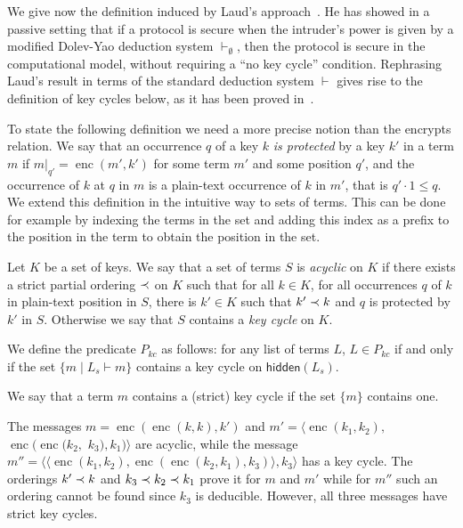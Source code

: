 \documentclass[acmtocl,acmnow]{acmtrans2m}
\newcommand{\set}[1]{\lbrace{#1}\rbrace}
\newcommand{\pair}[2]{\langle{#1},{#2}\rangle}
\newcommand{\penc}[2]{\operatorname{enc}(#1,#2)}
\newcommand{\enc}{\operatorname{enc}}
\newcommand{\lset}[1]{#1_s}
\newcommand{\hidden}[1]{\mathsf{hidden}({#1})}
\begin{document}
We give now the definition induced by Laud's approach~\cite{Laud-NORDSEC02}. He has showed in a passive
setting that if a protocol is secure when the intruder's power is given by a modified Dolev-Yao deduction
system $\vdash_{\emptyset}$, then the protocol is secure in the computational model, without requiring a ``no
key cycle'' condition. Rephrasing Laud's result in terms of the standard deduction system $\vdash$ gives rise
to the definition of key cycles below, as it has been proved in~\cite{Janvier-these}.

To state the following definition we need a more precise notion than the encrypts relation. We say that
an occurrence $q$ of a key $k$ \emph{is protected} by a key $k'$ in a term $m$
if $m|_{q'}=\penc{m'}{k'}$ for some term $m'$ and some position $q'$, and the occurrence of $k$ at $q$ in
$m$ is a plain-text
occurrence of $k$ in $m'$, that is $q'\cdot 1\le q$. We extend this definition in the intuitive way to sets of terms. This can be done for example
by indexing the terms in the set and adding this index as a prefix to the position in the term to
obtain the position in the set.




\begin{definition}\label{def:kc}Let $K$ be a set of keys. We say that a set of terms $S$ is \emph{acyclic} on $K$ if there
exists a strict partial ordering
$\prec$ on $K$ such that for all $k\in K$, for all occurrences $q$ of $k$ in plain-text position in $S$, there
is $k'\in K$ such that $k'\prec k$ and $q$ is protected by $k'$ in $S$. Otherwise we say that $S$ contains a \emph{key cycle} on $K$.

We define the predicate $P_{kc}$ as follows: for any list of terms $L$,
$L\in P_{kc}$ if and only if
the set $\set{m\mid \lset{L}\vdash m}$ contains a key cycle on $\hidden{\lset{L}}$.
\end{definition}

We say that a term $m$ contains a (strict) key cycle if the set $\{m\}$ contains one.

\begin{example}
The messages $m=\enc(\enc({k},{k}),{k'})$ and
$m'\!=\!\langle{\enc(k_1,k_2)},$ $\enc(\enc(k_2,$ $k_3),k_1)\rangle$
are acyclic, while the message
$m''\!=\pair{\pair{\enc(k_1,k_2)}{\enc(\enc(k_2,k_1),k_3)}}{k_3}$ has
a key cycle. The orderings $k'\prec k$ and $k_3\prec k_2\prec k_1$ prove it
for $m$ and $m'$ while for $m''$ such an ordering cannot be found since
$k_3$ is deducible. However, all three messages have strict key
cycles.
\end{example}
\end{document}
